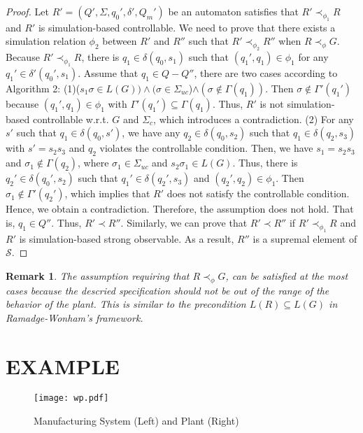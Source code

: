 \documentclass[12pt,draftcls,onecolumn]{IEEEtran}
\newtheorem{Remark}{Remark}
\begin{document}
\begin{proof}
Let $R'=(Q', \Sigma, q_0', \delta', Q_m')$ be an automaton
satisfies that $R'\prec_{\phi_{1}} R$ and $R'$ is simulation-based
controllable. We need to prove that there exists a simulation
relation $\phi_2$ between $R'$ and $R''$ such that $R'
\prec_{\phi_{2}} R''$ when $R\prec_{\phi} G$. Because
$R'\prec_{\phi_{1}} R$, there is $q_1 \in \delta(q_0, s_1)$ such
that $(q_1', q_1) \in \phi_{1}$ for any $q_1' \in \delta'(q_0',
s_1)$. Assume that $q_1 \in Q - Q''$, there are two cases
according to Algorithm 2: (1)($s_1\sigma\in L(G))\wedge(\sigma \in
\Sigma_{uc}$)$\wedge(\sigma \notin \Gamma(q_1))$. Then $\sigma
\notin \Gamma'(q_1')$ because $(q_1', q_1) \in \phi_{1}$ with
$\Gamma'(q_1')\subseteq \Gamma(q_1)$. Thus, $R'$ is not
simulation-based controllable w.r.t. $G$ and $\Sigma_{c}$, which
introduces a contradiction. (2) For any $s'$ such that $q_1 \in
\delta(q_0, s')$, we have any $q_2 \in \delta(q_0, s_2)$ such that
$q_1 \in \delta(q_2, s_3)$ with $s'=s_2s_3$ and $q_2$ violates the
controllable condition. Then, we have $s_1=s_2s_3$ and $\sigma_1
\notin \Gamma(q_2)$, where $\sigma_1 \in \Sigma_{uc}$ and
$s_2\sigma_1\in L(G)$. Thus, there is $q_2' \in \delta(q_0', s_2)$
such that $q_1' \in \delta(q_2', s_3)$ and $(q_2', q_2) \in
\phi_{1}$. Then $\sigma_1 \notin \Gamma'(q_2')$, which implies
that $R'$ does not satisfy the controllable condition. Hence, we
obtain a contradiction. Therefore, the assumption does not hold.
That is, $q_1 \in Q''$. Thus, $R'\prec R''$. Similarly, we can
prove that $R'\prec R''$ if $R'\prec_{\phi_{1}} R$ and $R'$ is
simulation-based strong observable. As a result, $R''$ is a
supremal element of $\mathcal{S}$.
\end{proof}

\begin{Remark}
The assumption requiring that $R\prec_{\phi} G$, can be satisfied
at the most cases because the descried specification should not be
out of the range of the behavior of the plant. This is similar to
the precondition $L(R)\subseteq L(G)$ in Ramadge-Wonham's
framework.
\end{Remark}




\section{EXAMPLE}
\begin{figure}[!htb]
\begin{center}
\texttt{[image: wp.pdf]}
\caption{Manufacturing System (Left) and Plant (Right)} \label{all3}
\end{center}
\end{figure}
\end{document}
